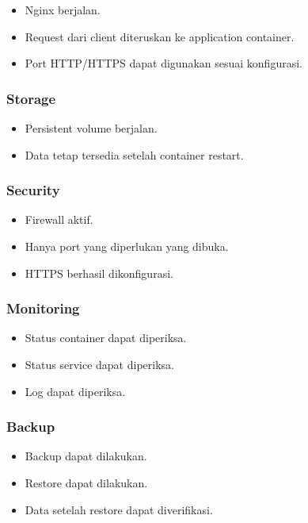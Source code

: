 \documentclass[
]{article}
\providecommand{\tightlist}{%
  \setlength{\itemsep}{0pt}\setlength{\parskip}{0pt}}
\begin{document}
\begin{itemize}
\tightlist
\item
  Nginx berjalan.
\item
  Request dari client diteruskan ke application container.
\item
  Port HTTP/HTTPS dapat digunakan sesuai konfigurasi.
\end{itemize}

\subsubsection{Storage}\label{storage}

\begin{itemize}
\tightlist
\item
  Persistent volume berjalan.
\item
  Data tetap tersedia setelah container restart.
\end{itemize}

\subsubsection{Security}\label{security-1}

\begin{itemize}
\tightlist
\item
  Firewall aktif.
\item
  Hanya port yang diperlukan yang dibuka.
\item
  HTTPS berhasil dikonfigurasi.
\end{itemize}

\subsubsection{Monitoring}\label{monitoring-1}

\begin{itemize}
\tightlist
\item
  Status container dapat diperiksa.
\item
  Status service dapat diperiksa.
\item
  Log dapat diperiksa.
\end{itemize}

\subsubsection{Backup}\label{backup}

\begin{itemize}
\tightlist
\item
  Backup dapat dilakukan.
\item
  Restore dapat dilakukan.
\item
  Data setelah restore dapat diverifikasi.
\end{itemize}
\end{document}
